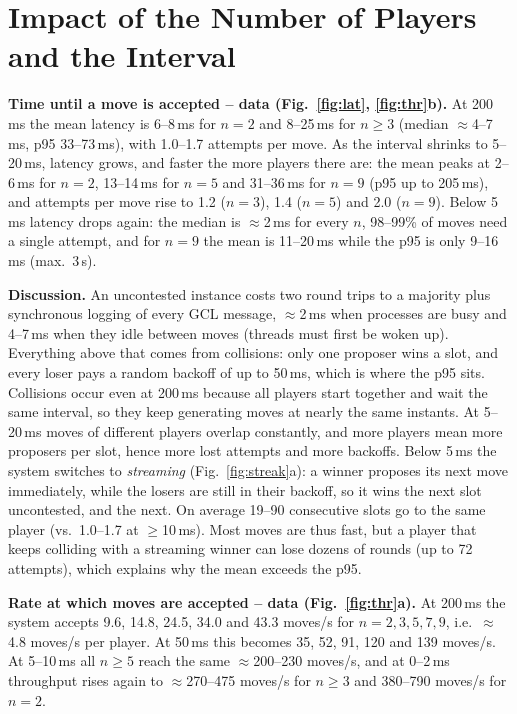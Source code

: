 \documentclass[11pt]{article}
\begin{document}
\section{Impact of the Number of Players and the Interval}
\textbf{Time until a move is accepted -- data (Fig.~\ref{fig:lat}, \ref{fig:thr}b).} At 200\,ms the mean latency is 6--8\,ms for $n=2$ and 8--25\,ms for $n\ge3$ (median $\approx$4--7\,ms, p95 33--73\,ms), with 1.0--1.7 attempts per move. As the interval shrinks to 5--20\,ms, latency grows, and faster the more players there are: the mean peaks at 2--6\,ms for $n=2$, 13--14\,ms for $n=5$ and 31--36\,ms for $n=9$ (p95 up to 205\,ms), and attempts per move rise to 1.2 ($n=3$), 1.4 ($n=5$) and 2.0 ($n=9$). Below 5\,ms latency drops again: the median is $\approx$2\,ms for every $n$, 98--99\% of moves need a single attempt, and for $n=9$ the mean is 11--20\,ms while the p95 is only 9--16\,ms (max.\ 3\,s).

\textbf{Discussion.} An uncontested instance costs two round trips to a majority plus synchronous logging of every GCL message, $\approx$2\,ms when processes are busy and 4--7\,ms when they idle between moves (threads must first be woken up). Everything above that comes from collisions: only one proposer wins a slot, and every loser pays a random backoff of up to 50\,ms, which is where the p95 sits. Collisions occur even at 200\,ms because all players start together and wait the same interval, so they keep generating moves at nearly the same instants. At 5--20\,ms moves of different players overlap constantly, and more players mean more proposers per slot, hence more lost attempts and more backoffs. Below 5\,ms the system switches to \emph{streaming} (Fig.~\ref{fig:streak}a): a winner proposes its next move immediately, while the losers are still in their backoff, so it wins the next slot uncontested, and the next. On average 19--90 consecutive slots go to the same player (vs.\ 1.0--1.7 at $\ge$10\,ms). Most moves are thus fast, but a player that keeps colliding with a streaming winner can lose dozens of rounds (up to 72 attempts), which explains why the mean exceeds the p95.

\textbf{Rate at which moves are accepted -- data (Fig.~\ref{fig:thr}a).} At 200\,ms the system accepts 9.6, 14.8, 24.5, 34.0 and 43.3 moves/s for $n=2,3,5,7,9$, i.e.\ $\approx$4.8 moves/s per player. At 50\,ms this becomes 35, 52, 91, 120 and 139 moves/s. At 5--10\,ms all $n\ge5$ reach the same $\approx$200--230 moves/s, and at 0--2\,ms throughput rises again to $\approx$270--475 moves/s for $n\ge3$ and 380--790 moves/s for $n=2$.
\end{document}
